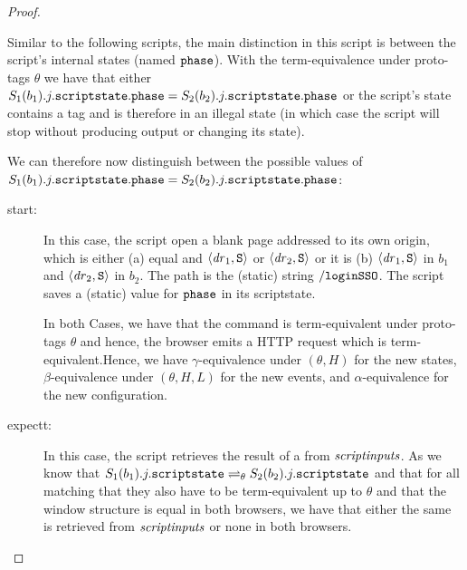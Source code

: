 \begin{theorem}
\begin{proof}
\begin{description}
\begin{description}
\begin{enumerate}
            Similar to the following scripts, the main 
            distinction in this script is between the script's 
            internal states (named $\mathtt{phase}$). With the 
            term-equivalence under proto-tags $\theta$ we have 
            that either 
            $S_1(b_1).j.\mathtt{scriptstate}.\mathtt{phase} =
             S_2(b_2).j.\mathtt{scriptstate}.\mathtt{phase}$ or the 
            script's state contains a tag and is therefore in an 
            illegal state (in which case the script will stop 
            without producing output or changing its state).
  
            We can therefore now distinguish between the 
            possible values of
            $S_1(b_1).j.\mathtt{scriptstate}.\mathtt{phase} =
             S_2(b_2).j.\mathtt{scriptstate}.\mathtt{phase}$:
            \begin{description}
            \item[start:] In this case, the script open a blank
              page addressed to its own origin, which is either 
              (a) equal and $\langle\mathit{dr}_1,\mathtt{S}\rangle$ or 
              $\langle\mathit{dr}_2,\mathtt{S}\rangle$ or it is 
              (b) $\langle\mathit{dr}_1,\mathtt{S}\rangle$ in $b_1$ and
              $\langle\mathit{dr}_2,\mathtt{S}\rangle$ in $b_2$. The path is the 
              (static) string $\mathtt{/loginSSO}$. The script 
              saves a (static) value for $\mathtt{phase}$ in its 
              scriptstate.
  
              In both Cases, we have that the command is 
              term-equivalent under proto-tags $\theta$ and 
              hence, the browser emits a HTTP request which is 
              term-equivalent.Hence, we have 
              $\gamma$-equivalence under $(\theta,H)$ for the 
              new states, $\beta$-equivalence under 
              $(\theta,H,L)$ for the new events, and 
              $\alpha$-equivalence for the new configuration.
            
            \item[expectt:] In this case, the script retrieves 
              the result of a \pm from $\mathit{scriptinputs}$. As 
              we know that $S_1(b_1).j.\mathtt{scriptstate} 
              \rightleftharpoons_{\theta} 
              S_2(b_2).j.\mathtt{scriptstate}$ and that for all 
              matching \pms that they also have to be 
              term-equivalent up to $\theta$ and that the window 
              structure is equal in both browsers, we have that 
              either the same \pm is retrieved from 
              $\mathit{scriptinputs}$ or none in both browsers.
  

\end{description}
\end{enumerate}
\end{description}
\end{description}
\end{proof}
\end{theorem}
